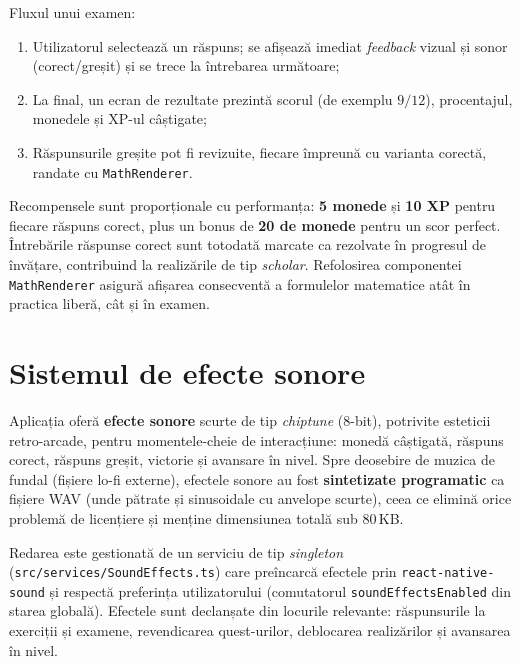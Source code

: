 \documentclass[12pt, a4paper, twoside]{report}
\numberwithin{equation}{section}
\begin{document}

Fluxul unui examen:
\begin{enumerate}
  \item Utilizatorul selectează un răspuns; se afișează imediat \textit{feedback} vizual și
    sonor (corect/greșit) și se trece la întrebarea următoare;
  \item La final, un ecran de rezultate prezintă scorul (de exemplu $9/12$), procentajul,
    monedele și XP-ul câștigate;
  \item Răspunsurile greșite pot fi revizuite, fiecare împreună cu varianta corectă, randate
    cu \texttt{MathRenderer}.
\end{enumerate}

Recompensele sunt proporționale cu performanța: \textbf{5 monede} și \textbf{10 XP} pentru
fiecare răspuns corect, plus un bonus de \textbf{20 de monede} pentru un scor perfect.
Întrebările răspunse corect sunt totodată marcate ca rezolvate în progresul de învățare,
contribuind la realizările de tip \textit{scholar}. Refolosirea componentei \texttt{MathRenderer}
asigură afișarea consecventă a formulelor matematice atât în practica liberă, cât și în examen.

\section{Sistemul de efecte sonore}
\label{sec:sfx}

Aplicația oferă \textbf{efecte sonore} scurte de tip \textit{chiptune} (8-bit), potrivite
esteticii retro-arcade, pentru momentele-cheie de interacțiune: monedă câștigată, răspuns
corect, răspuns greșit, victorie și avansare în nivel. Spre deosebire de muzica de fundal
(fișiere lo-fi externe), efectele sonore au fost \textbf{sintetizate programatic} ca fișiere
WAV (unde pătrate și sinusoidale cu anvelope scurte), ceea ce elimină orice problemă de
licențiere și menține dimensiunea totală sub 80\,KB.

Redarea este gestionată de un serviciu de tip \textit{singleton} (\texttt{src/services/SoundEffects.ts})
care preîncarcă efectele prin \texttt{react-native-sound} și respectă preferința utilizatorului
(comutatorul \texttt{soundEffectsEnabled} din starea globală). Efectele sunt declanșate din
locurile relevante: răspunsurile la exerciții și examene, revendicarea quest-urilor, deblocarea
realizărilor și avansarea în nivel.
\end{document}

